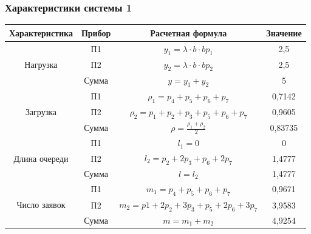 \subsubsection{Характеристики системы 1}
\begin{tabular}{|c|c|c|c|}
\hline
Характеристика                      & Прибор & Расчетная формула                                                       & Значение \\ \hline
\multirow{3}{*}{Нагрузка}           & П1     & $y_1 = \lambda\cdot b\cdot b p_1$                                       & 2,5      \\ \cline{2-4}
                                    & П2     & $y_2 = \lambda\cdot b\cdot b p_2$                                       & 2,5      \\ \cline{2-4}
                                    & Сумма  & $y = y_1 + y_2$                                                         & 5        \\ \hline
\multirow{3}{*}{Загрузка}           & П1     & $\rho_1 = p_4 + p_5 + p_6 + p_7$                                        & 0,7142   \\ \cline{2-4}
                                    & П2     & $\rho_2 = p_1 + p_2 + p_3 + p_5 + p_6 + p_7$                            & 0,9605   \\ \cline{2-4}
                                    & Сумма  & $\rho = \frac{\rho_1 + \rho_2}{2}$                                      & 0,83735  \\ \hline
\multirow{3}{*}{Длина очереди}      & П1     & $l_1 = 0$                                                               & 0        \\ \cline{2-4}
                                    & П2     & $l_2 = p_2 + 2p_3 + p_6 + 2p_7$                                         & 1,4777   \\ \cline{2-4}
                                    & Сумма  & $l = l_2$                                                               & 1,4777   \\ \hline
\multirow{3}{*}{Число заявок}       & П1     & $m_1 = p_4 + p_5 + p_6 + p_7$                                           & 0,9671   \\ \cline{2-4}
                                    & П2     & $m_2 = p1 + 2p_2 + 3p_3 + p_5 + 2p_6 + 3p_7$                            & 3,9583   \\ \cline{2-4}
                                    & Сумма  & $m = m_1 + m_2$                                                         & 4,9254   \\ \hline

\end{tabular}
